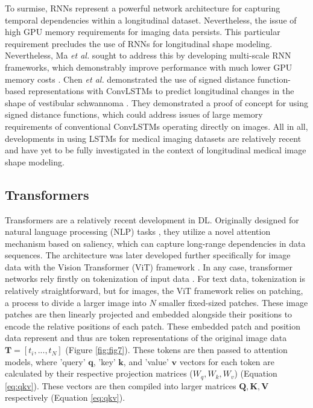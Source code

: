 		To surmise, RNNs represent a powerful network architecture for capturing temporal dependencies within a longitudinal dataset. Nevertheless, the issue of high GPU memory requirements for imaging data persists. This particular requirement precludes the use of RNNs for longitudinal shape modeling. Nevertheless, Ma \textit{et al.} sought to address this by developing multi-scale RNN frameworks, which demonstrably improve performance with much lower GPU memory costs \cite{MaZhangLiu22, Ma2023a}. Chen \textit{et al.} demonstrated the use of signed distance function-based representations with ConvLSTMs to predict longitudinal changes in the shape of vestibular schwannoma \cite{ChenWolterJelmerNeve2024}. They demonstrated a proof of concept for using signed distance functions, which could address issues of large memory requirements of conventional ConvLSTMs operating directly on images. All in all, developments in using LSTMs for medical imaging datasets are relatively recent and have yet to be fully investigated in the context of longitudinal medical image shape modeling. 
	
	\subsection{Transformers}
		
		Transformers are a relatively recent development in DL. Originally designed for natural language processing (NLP) tasks \cite{Vaswani2017}, they utilize a novel attention mechanism based on saliency, which can capture long-range dependencies in data sequences. The architecture was later developed further specifically for image data with the Vision Transformer (ViT) framework \cite{Dosovitskiy2020}. In any case, transformer networks rely firstly on tokenization of input data \cite{Shamshad2023, Islam2024, Torralba2024-ce}. For text data, tokenization is relatively straightforward, but for images, the ViT framework relies on patching, a process to divide a larger image into $N$ smaller fixed-sized patches. These image patches are then linearly projected and embedded alongside their positions to encode the relative positions of each patch. These embedded patch and position data represent and thus are token representations of the original image data $\mathbf{T} = [t_{i},..., t_{N}]$ (Figure \ref{fig:fig7}). These tokens are then passed to attention models,  where 'query' $\mathbf{q}$, 'key' $\mathbf{k}$, and 'value' $\mathbf{v}$ vectors for each token are calculated by their respective projection matrices ($W_{q}, W_{k}, W_{v}$) (Equation \ref{eq:qkv}). These vectors are then compiled into larger matrices $\mathbf{Q}, \mathbf{K}, \mathbf{V}$ respectively (Equation \ref{eq:qkv}). 
		
